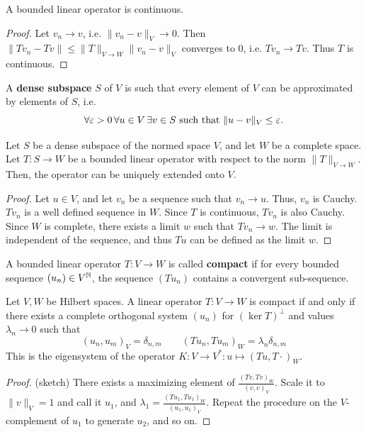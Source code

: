\begin{lemma} A bounded linear operator is continuous.
\end{lemma}
\begin{proof} Let $v_n \rightarrow v$, i.e. $\| v_n - v \|_V \rightarrow 0$.  
Then $\| T v_n - T v \| \leq \| T \|_{V \rightarrow W } \| v_n - v \|_V$ converges to 0,
i.e. $T v_n \rightarrow T v$. Thus $T$ is continuous.
\end{proof}

\begin{definition} A {\bf dense subspace} $S$ of $V$ is such that every element of $V$ 
can be approximated by elements of $S$, i.e.
$$
\forall {\varepsilon> 0} \,  \forall { u \in V }  \, \exists { v \in S }  \mbox{ such that } \| u - v \|_V \leq \varepsilon.
$$
\end{definition}
\begin{lemma}  Let $S$ be a dense subspace of the normed space $V$, 
and let $W$ be a complete space. Let $T : S \rightarrow W$ be a bounded linear operator 
with respect to the norm $\| T \|_{V \rightarrow W}$. Then, the operator can be uniquely extended onto $V$.
\end{lemma}
\begin{proof} Let $u \in V$, and let $v_n$ be a sequence such that $v_n \rightarrow u$. Thus, $v_n$ is Cauchy. $T v_n$ is a well defined sequence in $W$. Since $T$ is continuous, $T v_n$ is also Cauchy. Since $W$ is complete, there exists a limit $w$ such that $T v_n \rightarrow w$. The limit is independent of the sequence, and thus $T u$ can be defined as the limit $w$.
\end{proof}



\begin{definition} A bounded linear operator $T : V \rightarrow W$ is called {\bf compact} if for every bounded sequence $(u_n) \in V^{\mathbb N}$, the sequence $(T u_n)$ contains a convergent sub-sequence.
\end{definition}

\begin{lemma} Let $V, W$ be Hilbert spaces. A linear operator $T : V \rightarrow W$ is
  compact if and only if there exists a complete orthogonal system
  $(u_n)$ for $(\operatorname{ker} T)^\bot$ and values $\lambda_n \rightarrow 0$ such that
$$
(u_n, u_m)_V = \delta_{n,m} \qquad (T u_n, T u_m)_W = \lambda_n \delta_{n,m}
$$
This is the eigensystem of the operator $K : V \rightarrow V^\ast : u \mapsto (T u, T \cdot)_W$.
\end{lemma}
\begin{proof} (sketch) There exists a maximizing element of $\frac{ (Tv, Tv)_W } { (v,v)_V }$.
Scale it to $\| v \|_V = 1 $ and call it $u_1$, and $\lambda_1 = \frac{ (Tu_1, Tu_1)_W } { (u_1,u_1)_V }$. Repeat the procedure on the $V$-complement of $u_1$ to generate $u_2$, and so on. 
\end{proof}


